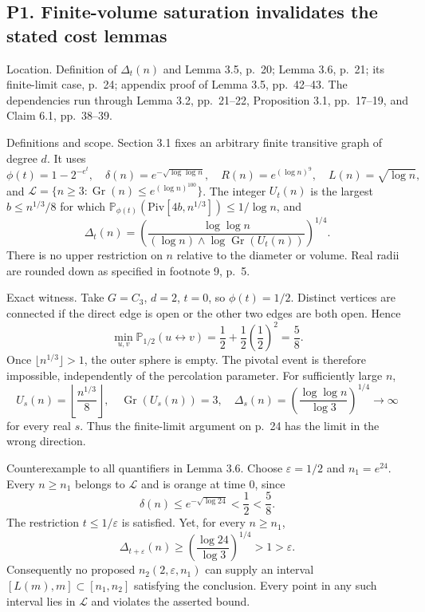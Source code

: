 \documentclass[10pt]{article}
\begin{document}
\subsection*{P1. Finite-volume saturation invalidates the stated cost lemmas}
Location. Definition of \(\Delta_t(n)\) and Lemma 3.5, p. 20; Lemma 3.6, p. 21; its finite-limit case, p. 24; appendix proof of Lemma 3.5, pp. 42–43. The dependencies run through Lemma 3.2, pp. 21–22, Proposition 3.1, pp. 17–19, and Claim 6.1, pp. 38–39.\par
Definitions and scope. Section 3.1 fixes an arbitrary finite transitive graph of degree \(d\). It uses \[\phi(t)=1-2^{-e^t},\quad
 \delta(n)=e^{-\sqrt{\log\log n}},\quad
 R(n)=e^{(\log n)^9},\quad L(n)=\sqrt{\log n},\] and \(\mathcal L=\{n\ge3:\operatorname{Gr}(n)\le e^{(\log n)^{100}}\}\). The integer \(U_t(n)\) is the largest \(b\le n^{1/3}/8\) for which \(\mathbb P_{\phi(t)}(\mathrm{Piv}[4b,n^{1/3}])\le1/\log n\), and \[\Delta_t(n)=
 \left(\frac{\log\log n}{(\log n)\wedge\log\operatorname{Gr}(U_t(n))}\right)^{1/4}.\] There is no upper restriction on \(n\) relative to the diameter or volume. Real radii are rounded down as specified in footnote 9, p. 5.\par
Exact witness. Take \(G=C_3\), \(d=2\), \(t=0\), so \(\phi(t)=1/2\). Distinct vertices are connected if the direct edge is open or the other two edges are both open. Hence \[\min_{u,v}\mathbb P_{1/2}(u\leftrightarrow v)
 =\frac12+\frac12\left(\frac12\right)^2=\frac58.\] Once \(\lfloor n^{1/3}\rfloor>1\), the outer sphere is empty. The pivotal event is therefore impossible, independently of the percolation parameter. For sufficiently large \(n\), \[U_s(n)=\left\lfloor\frac{n^{1/3}}8\right\rfloor,\quad
 \operatorname{Gr}(U_s(n))=3,\quad
 \Delta_s(n)=\left(\frac{\log\log n}{\log3}\right)^{1/4}
 \longrightarrow\infty\] for every real \(s\). Thus the finite-limit argument on p. 24 has the limit in the wrong direction.\par
Counterexample to all quantifiers in Lemma 3.6. Choose \(\varepsilon=1/2\) and \(n_1=e^{24}\). Every \(n\ge n_1\) belongs to \(\mathcal L\) and is orange at time \(0\), since \[\delta(n)\le e^{-\sqrt{\log24}}<\frac12<\frac58.\] The restriction \(t\le1/\varepsilon\) is satisfied. Yet, for every \(n\ge n_1\), \[\Delta_{t+\varepsilon}(n)
 \ge\left(\frac{\log24}{\log3}\right)^{1/4}>1>\varepsilon.\] Consequently no proposed \(n_2(2,\varepsilon,n_1)\) can supply an interval \([L(m),m]\subset[n_1,n_2]\) satisfying the conclusion. Every point in any such interval lies in \(\mathcal L\) and violates the asserted bound.\par
\end{document}
